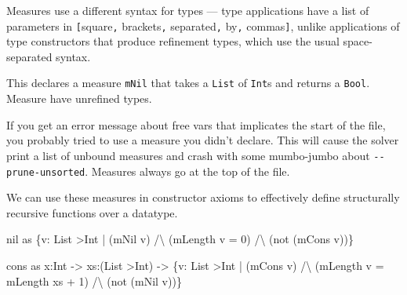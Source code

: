 \documentclass[
]{darts-v2021}
\newenvironment{Shaded}{}{}
\newcommand{\DataTypeTok}[1]{\textcolor[rgb]{0.56,0.13,0.00}{#1}}
\newcommand{\DecValTok}[1]{\textcolor[rgb]{0.25,0.63,0.44}{#1}}
\newcommand{\FunctionTok}[1]{\textcolor[rgb]{0.02,0.16,0.49}{#1}}
\newcommand{\NormalTok}[1]{#1}
\newcommand{\OperatorTok}[1]{\textcolor[rgb]{0.40,0.40,0.40}{#1}}
\newcommand{\OtherTok}[1]{\textcolor[rgb]{0.00,0.44,0.13}{#1}}
\renewenvironment{quote}{\begin{myquote}}{\end{myquote}}
\begin{document}
\begin{quote}
Measures use a different syntax for types --- type applications have a
list of parameters in \texttt{{[}}square\texttt{,} brackets\texttt{,}
separated\texttt{,} by\texttt{,} commas\texttt{{]}}, unlike applications
of type constructors that produce refinement types, which use the usual
space-separated syntax.
\end{quote}

This declares a measure \texttt{mNil} that takes a \texttt{List} of
\texttt{Int}s and returns a \texttt{Bool}. Measure have unrefined types.

\begin{quote}
If you get an error message about free vars that implicates the start of
the file, you probably tried to use a measure you didn't declare. This
will cause the solver print a list of unbound measures and crash with
some mumbo-jumbo about \texttt{-\/-prune-unsorted}. Measures always go
at the top of the file.
\end{quote}

We can use these measures in constructor axioms to effectively define
structurally recursive functions over a datatype.

\begin{Shaded}
\begin{Highlighting}[numbers=left,,firstnumber=10,]
\NormalTok{nil as \{v}\OperatorTok{:} \DataTypeTok{List} \OperatorTok{\textgreater{}}\DataTypeTok{Int} \OperatorTok{|}\NormalTok{ (mNil v) }\OperatorTok{/}\NormalTok{\textbackslash{} (mLength v }\OtherTok{=} \DecValTok{0}\NormalTok{) }\OperatorTok{/}\NormalTok{\textbackslash{} (}\FunctionTok{not}\NormalTok{ (mCons v))\}}
\end{Highlighting}
\end{Shaded}

\begin{Shaded}
\begin{Highlighting}[numbers=left,,firstnumber=13,]
\NormalTok{cons as x}\OperatorTok{:}\DataTypeTok{Int} \OtherTok{{-}\textgreater{}}\NormalTok{ xs}\OperatorTok{:}\NormalTok{(}\DataTypeTok{List} \OperatorTok{\textgreater{}}\DataTypeTok{Int}\NormalTok{) }\OtherTok{{-}\textgreater{}}
\NormalTok{  \{v}\OperatorTok{:} \DataTypeTok{List} \OperatorTok{\textgreater{}}\DataTypeTok{Int} \OperatorTok{|}\NormalTok{ (mCons v) }\OperatorTok{/}\NormalTok{\textbackslash{} (mLength v }\OtherTok{=}\NormalTok{ mLength xs }\OperatorTok{+} \DecValTok{1}\NormalTok{) }\OperatorTok{/}\NormalTok{\textbackslash{} (}\FunctionTok{not}\NormalTok{ (mNil v))\}}
\end{Highlighting}
\end{Shaded}
\end{document}
